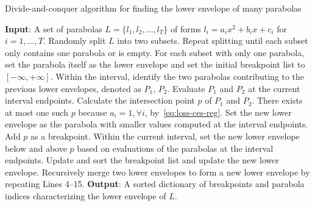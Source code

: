
\begin{algorithm}[H]
    \caption{Divide-and-conquer algorithm for finding the lower envelope of many parabolas}
    \label{alg:envelope}
    \begin{algorithmic} [1]
        \STATE \textbf{Input}: A set of parabolas $L = \{l_1, l_2, \dots, l_T \}$ of forms $l_i = a_i x^2 + b_i x + c_i$ for $i=1,\dots, T$.
        \STATE Randomly split $L$ into two subsets. Repeat splitting until each subset only contains one parabola or is empty.
        \STATE For each subset with only one parabola, set the parabola itself as the lower envelope and set the initial breakpoint list to $[-\infty, +\infty]$.
            \STATE Within the interval, identify the two parabolas contributing to the previous lower envelopes, denoted as $P_1$, $P_2$.
            \STATE Evaluate $P_1$ and $P_2$ at the current interval endpoints.
            \STATE Calculate the intersection point $p$ of $P_1$ and $P_2$. There exists at most one such $p$ because $a_i = 1, \forall i$, by~\eqref{eq:loss-ces-reg}.
            \STATE Set the new lower envelope as the parabola with smaller values computed at the interval endpoints.
            \ELSE \STATE Add $p$ as a breakpoint.
            \STATE Within the current interval, set the new lower envelope below and above $p$ based on evaluations of the parabolas at the interval endpoints.
            \ENDIF
            \STATE Update and sort the breakpoint list and update the new lower envelope.
        \ENDFOR
        \STATE Recursively merge two lower envelopes to form a new lower envelope by repeating Lines 4--15.
        \STATE \textbf{Output}: A sorted dictionary of breakpoints and parabola indices characterizing the lower envelope of $L$.
\end{algorithmic}
\end{algorithm}


